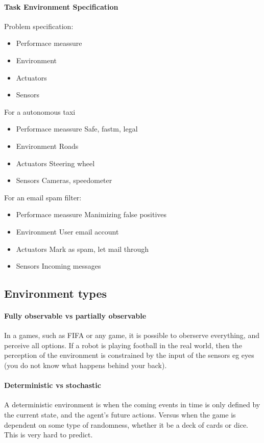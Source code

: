 \documentclass{article}
\begin{document}
\paragraph{Task Environment Specification}
Problem specification:
\begin{itemize}
  \item Performace meassure
  \item Environment
  \item Actuators
  \item Sensors
\end{itemize}
For a autonomous taxi
\begin{itemize}
  \item Performace meassure
    \subitem Safe, fastm, legal
  \item Environment
    \subitem Roads
  \item Actuators
    \subitem Steering wheel
  \item Sensors
    \subitem Cameras, speedometer
\end{itemize}

For an email spam filter:
\begin{itemize}
  \item Performace meassure
    \subitem Manimizing false positives
  \item Environment
    \subitem User email account
  \item Actuators
    \subitem Mark as spam, let mail through
  \item Sensors
    \subitem Incoming messages
\end{itemize}

\subsection{Environment types}%
\label{sub:environment_types}
\paragraph{Fully observable vs partially observable}
In a games, such as FIFA or any game, it is possible to oberserve everything,
and perceive all options.
If a robot is playing football in the real world, then the perception of the
environment is constrained by the input of the sensors eg eyes (you do not know
what happens behind your back).

\paragraph{Deterministic vs stochastic}
A deterministic environment is when the coming events in time is only defined
by the current state, and the agent's future actions. Versus when the game is
dependent on some type of randomness, whether it be a deck of cards or dice.
This is very hard to predict.
\end{document}
